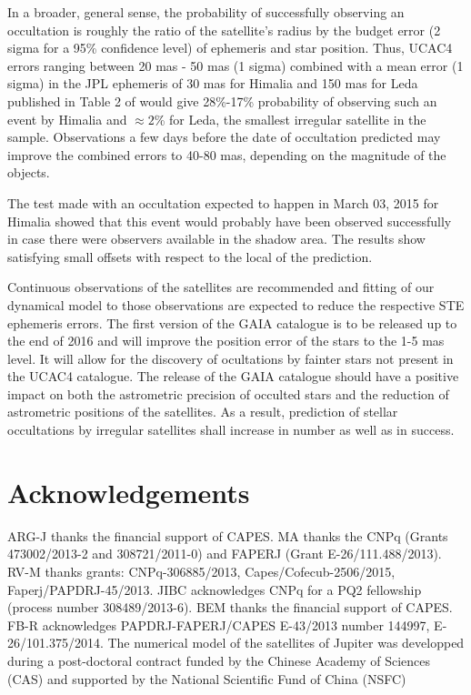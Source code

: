 \documentclass[useAMS,usenatbib]{mn2e}
\begin{document}
In a broader, general sense, the probability of successfully observing an occultation is roughly the ratio of the satellite's radius by the budget error (2 sigma for a 95\% confidence level) of ephemeris and star position. Thus, UCAC4 errors ranging between 20 mas - 50 mas (1 sigma) combined with a mean error (1 sigma) in the JPL ephemeris of 30 mas for Himalia and 150 mas for Leda published in Table 2 of \cite{Jacobson2012} would give 28\%-17\% probability of observing such an event by Himalia and $\approx2$\% for Leda, the smallest irregular satellite in the sample. Observations a few days before the date of occultation predicted may improve the combined errors to 40-80 mas, depending on the magnitude of the objects.

The test made with an occultation expected to happen in March 03, 2015 for Himalia showed that this event would probably have been observed successfully in case there were observers available in the shadow area. The results show satisfying small offsets with respect to the local of the prediction.

Continuous observations of the satellites are recommended and fitting of our dynamical model to those observations are expected to reduce the respective STE ephemeris errors. The first version of the GAIA catalogue is to be released up to the end of 2016 and will improve the position error of the stars to the 1-5 mas level. It will allow for the discovery of ocultations by fainter stars not present in the UCAC4 catalogue.
The release of the GAIA catalogue should have a positive impact on both the astrometric precision of occulted stars and the reduction of astrometric positions of the satellites. As a result, prediction of stellar occultations by irregular satellites shall increase in number as well as in success.

\section*{Acknowledgements}

ARG-J thanks the financial support of CAPES.
MA thanks the CNPq (Grants 473002/2013-2 and 308721/2011-0) and FAPERJ (Grant E-26/111.488/2013).
RV-M thanks grants: CNPq-306885/2013, Capes/Cofecub-2506/2015, Faperj/PAPDRJ-45/2013.
JIBC acknowledges CNPq for a PQ2 fellowship (process number 308489/2013-6).
BEM thanks the financial support of CAPES.
FB-R acknowledges PAPDRJ-FAPERJ/CAPES E-43/2013 number 144997, E-26/101.375/2014.
The numerical model of the satellites of Jupiter was developped during a post-doctoral contract funded by the Chinese Academy of Sciences (CAS) and supported by the National Scientific Fund of China (NSFC)






\label{lastpage}
\end{document}

